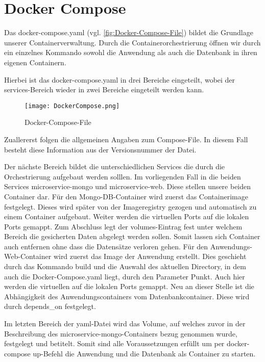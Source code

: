 
\chapter{Docker Compose}
\label{ch:Docker Compose}
Das docker-compose.yaml (vgl. \autoref{fig:Docker-Compose-File}) bildet die Grundlage unserer Containerverwaltung. Durch die Containerorchestrierung öffnen wir durch ein einzelnes Kommando sowohl die Anwendung als auch die Datenbank in ihren eigenen Containern.

Hierbei ist das docker-compose.yaml in drei Bereiche eingeteilt, wobei der services-Bereich wieder in zwei Bereiche eingeteilt werden kann.

\begin{wrapfigure}{r}{0\textwidth}
\centering
\texttt{[image: DockerCompose.png]}
\vspace{3pt}
\caption{Docker-Compose-File}
\label{fig:Docker-Compose-File}
\end{wrapfigure}


Zuallererst folgen die allgemeinen Angaben zum Compose-File. In diesem Fall besteht diese Information aus der Versionsnummer der Datei.

Der nächste Bereich bildet die unterschiedlichen Services die durch die Orchestrierung aufgebaut werden solllen. Im vorliegenden Fall in die beiden Services \glqq  microservice-mongo\grqq{} und \glqq  microservice-web\grqq{}. Diese stellen unsere beiden Container dar. 
Für den Mongo-DB-Container wird zuerst das Containerimage festgelegt. Dieses wird später von der Imageregistry gezogen und automatisch zu einem Container aufgebaut. Weiter werden die virtuellen Ports auf die lokalen Ports gemappt. Zum Abschluss legt der \glqq  volumes\grqq{}-Eintrag fest unter welchem Bereich die gesicherten Daten abgelegt werden sollen. Somit lassen sich Container auch entfernen ohne dass die Datensätze verloren gehen.
Für den Anwendungs-Web-Container wird zuerst das Image der Anwendung erstellt. Dies geschieht durch das Kommando \glqq  build\grqq{} und die Auswahl des aktuellen Directory, in dem auch die Docker-Compose.yaml liegt, durch den Parameter \glqq  Punkt\grqq{}. Auch hier werden die virtuellen auf die lokalen Ports gemappt. Neu an dieser Stelle ist die Abhängigkeit des Anwendungscontainers vom Datenbankcontainer. Diese wird durch \glqq  depends\_on\grqq{} festgelegt.

Im letzten Bereich der yaml-Datei wird das Volume, auf welches zuvor in der Beschreibung des \glqq  microservice-mongo\grqq{}-Containers bezug genommen wurde, festgelegt und betitelt.
Somit sind alle Voraussetzungen erfüllt um per \glqq  docker-compose up\grqq -Befehl die Anwendung und die Datenbank als Container zu starten.
